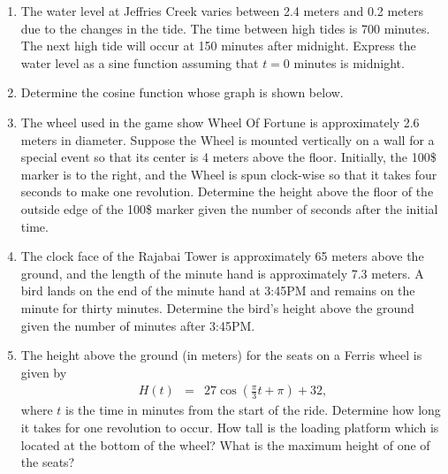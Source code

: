 \begin{enumerate}
\item The water level at Jeffries Creek varies between 2.4 meters and
  0.2 meters due to the changes in the tide. The time between high
  tides is 700 minutes. The next high tide will occur at 150 minutes
  after midnight. Express the water level as a sine function assuming
  that $t=0$ minutes is midnight.

\item Determine the cosine function whose graph is shown below.


\item The wheel used in the game show Wheel Of Fortune is
  approximately 2.6 meters in diameter. Suppose the Wheel is mounted
  vertically on a wall for a special event so that its center is 4
  meters above the floor. Initially, the 100\$ marker is to the right,
  and the Wheel is spun clock-wise so that it takes four seconds to
  make one revolution. Determine the height above the floor of the
  outside edge of the 100\$ marker given the number of seconds after
  the initial time.

\item The clock face of the Rajabai Tower is approximately 65 meters
  above the ground, and the length of the minute hand is approximately
  7.3 meters. A bird lands on the end of the minute hand at 3:45PM and
  remains on the minute for thirty minutes. Determine the bird's
  height above the ground given the number of minutes after 3:45PM.

\item The height above the ground (in meters) for the seats on a Ferris wheel is
  given by
  \begin{eqnarray*}
    H(t) & = & 27 \cos\left(\frac{\pi}{3}t+\pi\right) + 32,
  \end{eqnarray*}
  where $t$ is the time in minutes from the start of the
  ride. Determine how long it takes for one revolution to occur. How
  tall is the loading platform which is located at the bottom of the
  wheel? What is the maximum height of one of the seats?


\end{enumerate}
